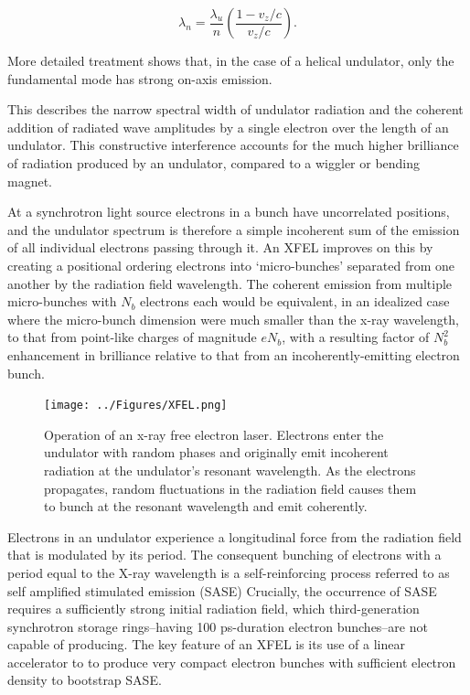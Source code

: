 \documentclass [11pt, proquest, article] {uwthesis}[2016/11/22]
\begin{document}
\begin{equation}
\lambda_n = \frac{\lambda_u}{n}(\frac{1 - v_z/c}{v_z/c}).
\end{equation}

More detailed treatment shows that, in the case of a helical undulator, only the fundamental mode has strong on-axis emission.%

This describes the narrow spectral width of undulator radiation and the coherent addition of radiated wave amplitudes by a single electron over the length of an undulator. This constructive interference accounts for the much higher brilliance of radiation produced by an undulator, compared to a wiggler or bending magnet. 

At a synchrotron light source electrons in a bunch have uncorrelated positions, and the undulator spectrum is therefore a simple incoherent sum of the emission of all individual electrons passing through it. An XFEL improves on this by creating a positional ordering electrons into `micro-bunches' separated from one another by the radiation field wavelength. The coherent emission from multiple micro-bunches with $N_b$ electrons each would be equivalent, in an idealized case where the micro-bunch dimension were much smaller than the x-ray wavelength, to that from point-like charges of magnitude $e N_b$, with a resulting factor of $N_b^2$ enhancement in brilliance relative to that from an incoherently-emitting electron bunch.%


\begin{figure}[h] 
\caption{Operation of an x-ray free electron laser.\cite{mcneil2010x} Electrons enter the undulator with random phases and originally emit incoherent radiation at the undulator's resonant wavelength. As the electrons propagates, random fluctuations in the radiation field causes them to bunch at the resonant wavelength and emit coherently.}
\label{fig:xfel}
\centering
\texttt{[image: ../Figures/XFEL.png]}
\end{figure}

Electrons in an undulator experience a longitudinal force from the radiation field that is modulated by its period. 
The consequent bunching of electrons with a period equal to the X-ray wavelength is a self-reinforcing process referred to as self amplified stimulated emission (SASE)%
Crucially, the occurrence of SASE requires a sufficiently strong initial radiation field, which third-generation synchrotron storage rings--having 100 ps-duration electron bunches--are not capable of producing. The key feature of an XFEL is its use of a linear accelerator to to produce very compact electron bunches with sufficient electron density to bootstrap SASE.
\end{document}
